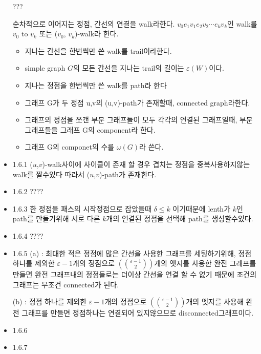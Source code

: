 \documentclass{oblivoir}
\begin{document}
\begin{itemize}
???



    \begin{dfn}[walk]순차적으로 이어지는 정점, 간선의 연결을 walk라한다. $v_{0}e_{1}v_{1}e_{2}v_{2} \cdots e_{k}v_{k}$인 walk를 $v_0$ to $v_k$ 또는 ($v_0$, $v_k$)-walk라 한다.
        \begin{itemize}
            \item 지나는 간선을 한번씩만 쓴 walk를 trail이라한다.
            \item simple graph $G$의 모든 간선을 지나는 trail의 길이는 $\varepsilon (W)$이다.
            \item 지나는 정점을 한번씩만 쓴 walk를 path라 한다
            \item 그래프 G가 두 정점 u,v의  (u,v)-path가 존재할때, connected graph라한다.
            \item 그래프의 정점을 쪼갠 부분 그래프들이 모두 각각의 연결된 그래프일때, 부분 그래프들을 그래프 G의 component라 한다.
            \item 그래프 G의 componet의 수를 $\omega(G)$라 쓴다.
        \end{itemize}
    \end{dfn}
    \item 1.6.1 ($u$,$v$)-walk사이에 사이클이 존재 할 경우 겹치는 정점을 중복사용하지않는 walk를 짤수있다 따라서 ($u$,$v$)-path가 존재한다.
    
    \item 1.6.2
    ????
    \item 1.6.3
    한 정점을 패스의 시작정점으로 잡았을때 $\delta \le k$ 이기때문에  lenth가 $k$인 path를 만들기위해 서로 다른 $k$개의 연결된 정점을 선택해 path를 생성할수있다.
    
    \item 1.6.4
    ????
    \item 1.6.5
    (a) : 최대한 적은 정점에 많은 간선을 사용한 그래프를 세팅하기위해,  정점 하나를 제외한 $\varepsilon-1$개의 정점으로 $(\varepsilon-1 \choose 2)$개의 엣지를 사용한 완전 그래프를 만들면 완전 그래프내의 정점들로는 더이상 간선을 연결 할 수 없기 때문에 조건의 그래프는 무조건 connected가 된다.

    (b) : 정점 하나를 제외한 $\varepsilon-1$개의 정점으로 $(\varepsilon-1 \choose 2)$개의 엣지를 사용해 완전 그래프를 만들면 정점하나는 연결되어 있지않으므로 disconnected그래프이다.

    \item 1.6.6
    \item 1.6.7


\end{itemize}
\end{document}
